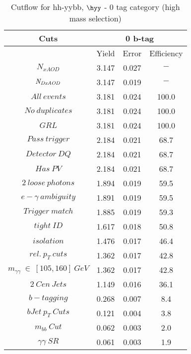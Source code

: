 \begin{table}\footnotesize
\begin{center}
\caption{Cutflow for hh-yybb, $\hyy$ - 0 tag category (high mass selection)}

\begin{tabular}{|c|c|c|c|}
\hline
Cuts& \multicolumn{3}{c|}{0 b-tag} \\ \hline
&Yield&Error&Efficiency\\ \hline
$N_{xAOD}$ & 3.147&0.027 &$-$ \\
\hline
$\it{N}_{DxAOD}$ & 3.147&0.019 &$-$ \\
\hline
$All\ events$ & 3.181&0.024 &100.0 \\
\hline
$No\ duplicates$ & 3.181&0.024 &100.0 \\
\hline
$GRL$ & 3.181&0.024 &100.0 \\
\hline
$Pass\ trigger$ & 2.184&0.021 &68.7 \\
\hline
$Detector\ DQ$ & 2.184&0.021 &68.7 \\
\hline
$Has\ PV$ & 2.184&0.021 &68.7 \\
\hline
$2\ loose\ photons$ & 1.894&0.019 &59.5 \\
\hline
$e-\gamma\ ambiguity$ & 1.891&0.019 &59.5 \\
\hline
$Trigger\ match$ & 1.885&0.019 &59.3 \\
\hline
$tight\ ID$ & 1.617&0.018 &50.8 \\
\hline
$isolation$ & 1.476&0.017 &46.4 \\
\hline
$rel.\ p_{T}\ cuts$ & 1.362&0.017 &42.8 \\
\hline
$m_{\gamma\gamma}\ \in\ [105,160]\ GeV$ & 1.362&0.017 &42.8 \\
\hline
$2\ Cen\ Jets$ & 1.149&0.016 &36.1 \\
\hline
$b-tagging$ & 0.268&0.007 & 8.4 \\
\hline
$bJet\ p_{T}\ Cuts$ & 0.121&0.004 & 3.8 \\
\hline
$m_{bb}\ Cut$ & 0.062&0.003 & 2.0 \\
\hline
$\gamma\gamma\ SR$ & 0.061&0.003 & 1.9 \\
\hline
\end{tabular}
\end{center}
\end{table}
